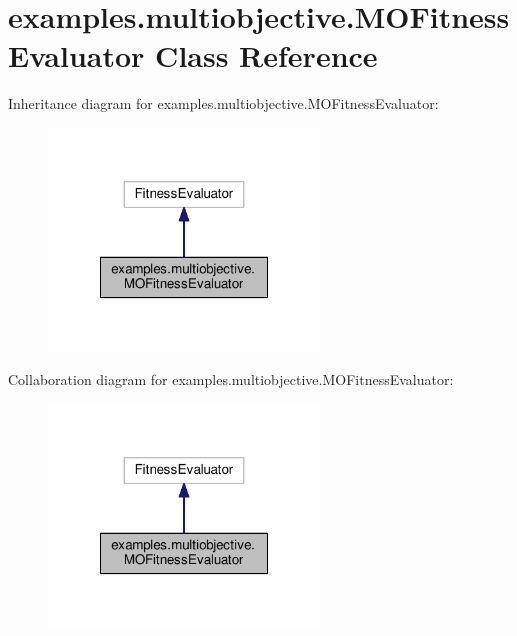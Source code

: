 \hypertarget{classexamples_1_1multiobjective_1_1_m_o_fitness_evaluator}{\section{examples.\-multiobjective.\-M\-O\-Fitness\-Evaluator Class Reference}
\label{classexamples_1_1multiobjective_1_1_m_o_fitness_evaluator}
}


Inheritance diagram for examples.\-multiobjective.\-M\-O\-Fitness\-Evaluator\-:
\nopagebreak
\begin{figure}[H]
\begin{center}
\leavevmode
\includegraphics[width=204pt]{classexamples_1_1multiobjective_1_1_m_o_fitness_evaluator__inherit__graph}
\end{center}
\end{figure}


Collaboration diagram for examples.\-multiobjective.\-M\-O\-Fitness\-Evaluator\-:
\nopagebreak
\begin{figure}[H]
\begin{center}
\leavevmode
\includegraphics[width=204pt]{classexamples_1_1multiobjective_1_1_m_o_fitness_evaluator__coll__graph}
\end{center}
\end{figure}
